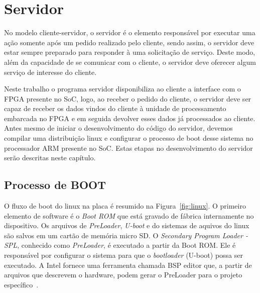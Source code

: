 \chapter{Servidor}

No modelo cliente-servidor, o servidor é o elemento responsável por executar uma ação somente após um pedido realizado pelo cliente, sendo assim, o servidor deve estar sempre preparado para responder à uma solicitação de serviço. Deste modo, além da capacidade de se comunicar com o cliente, o servidor deve oferecer algum serviço de interesse do cliente. 

Neste trabalho o programa servidor disponibiliza ao cliente a interface com o FPGA presente no SoC, logo, ao receber o pedido do cliente, o servidor deve ser capaz de receber os dados vindos do cliente à unidade de processamento embarcada no FPGA e em seguida devolver esses dados já processados ao cliente. Antes mesmo de iniciar o desenvolvimento do código do servidor, devemos compilar uma distribuição linux e configurar o processo de boot desse sistema no processador ARM presente no SoC. Estas etapas no desenvolvimento do servidor serão descritas neste capítulo.

\section{Processo de BOOT}
O fluxo de boot do linux na placa é resumido na Figura~\ref{fig:linux}. O primeiro elemento de software é o \textit{Boot ROM} que está gravado de fábrica internamente no dispositivo. Os arquivos de \textit{PreLoader},\textit{ U-boot} e do sistemas de aquivos do linux são salvos em um cartão de memória micro SD\@. O \textit{Secondary Program Loader - SPL}, conhecido como \textit{PreLoader}, é executado a partir da Boot ROM\@. Ele é responsável por configurar o sistema para que o \textit{bootloader} (U-boot) possa ser executado. A Intel fornece uma ferramenta chamada BSP editor que, a partir de arquivos que descrevem o hardware, podem gerar o PreLoader para o projeto específico~\cite{SocLinux}.  

